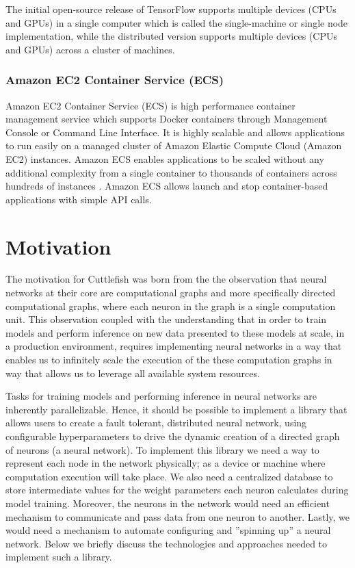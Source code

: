\documentclass[conference]{IEEEtran}
\begin{document}
The initial open-source release of TensorFlow supports multiple devices (CPUs and GPUs) \cite{tensor-home} in a single computer which is called the single-machine or single node implementation, while the distributed version supports multiple devices (CPUs and GPUs) across a cluster of machines.

\subsubsection{Amazon EC2 Container Service (ECS)}
Amazon EC2 Container Service (ECS) is high performance container management service which supports Docker containers through Management Console or Command Line Interface. It is highly scalable and allows applications to run easily on a managed cluster of Amazon Elastic Compute Cloud (Amazon EC2) instances. Amazon ECS enables applications to be scaled without any additional complexity from a single container to thousands of containers across hundreds of instances \cite{ecs-doc}. Amazon ECS allows launch and stop container-based applications with simple API calls. 

\section{Motivation}
The motivation for Cuttlefish was born from the the observation that neural networks at their core are computational graphs and more specifically directed computational graphs, where each neuron in the graph is a single computation unit. This observation coupled with the understanding that in order to train models and perform inference on new data presented to these models at scale, in a production environment, requires implementing neural networks in a way that enables us to infinitely scale the execution of the these computation graphs in way that allows us to leverage all available system resources.  

Tasks for training models and performing inference in neural networks are inherently parallelizable. Hence, it should be possible to implement a library that allows users to create a fault tolerant, distributed neural network, using configurable hyperparameters to drive the dynamic creation of a directed graph of neurons (a neural network).  To implement this library we need a way to represent each node in the network physically; as a device or machine where computation execution will take place. We also need a centralized database to store intermediate values for the weight parameters each neuron calculates during model training. Moreover, the neurons in the network would need an efficient mechanism to communicate and pass data from one neuron to another. Lastly, we would need a mechanism to automate configuring and ''spinning up'' a neural network.  Below we briefly discuss the technologies and approaches needed to implement such a library.
\end{document}
